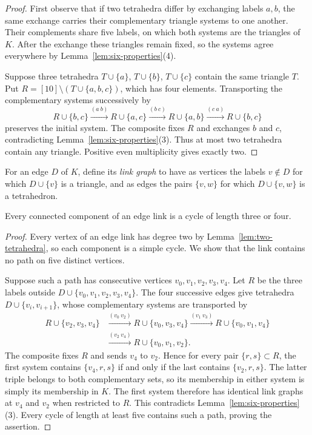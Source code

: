 \begin{proof}
First observe that if two tetrahedra differ by exchanging labels $a,b$,
the same exchange carries their complementary triangle systems to one
another. Their complements share five labels, on which both systems are
the triangles of $K$. After the exchange these triangles remain fixed,
so the systems agree everywhere by
Lemma~\ref{lem:six-properties}(4).

Suppose three tetrahedra $T\cup\{a\}$, $T\cup\{b\}$,
$T\cup\{c\}$ contain the same triangle $T$. Put
$R=[10]\setminus(T\cup\{a,b,c\})$, which has four elements. Transporting
the complementary systems successively by
\[
 R\cup\{b,c\}
 \xrightarrow{(a\ b)}R\cup\{a,c\}
 \xrightarrow{(b\ c)}R\cup\{a,b\}
 \xrightarrow{(c\ a)}R\cup\{b,c\}
\]
preserves the initial system. The composite fixes $R$ and exchanges $b$
and $c$, contradicting Lemma~\ref{lem:six-properties}(3). Thus at most
two tetrahedra contain any triangle. Positive even multiplicity gives
exactly two.
\end{proof}

For an edge $D$ of $K$, define its \emph{link graph} to have as vertices
the labels $v\notin D$ for which $D\cup\{v\}$ is a triangle, and as
edges the pairs $\{v,w\}$ for which $D\cup\{v,w\}$ is a tetrahedron.

\begin{lemma}\label{lem:short-links}
Every connected component of an edge link is a cycle of length three
or four.
\end{lemma}

\begin{proof}
Every vertex of an edge link has degree two by
Lemma~\ref{lem:two-tetrahedra}, so each component is a simple cycle.
We show that the link contains no path on five distinct vertices.

Suppose such a path has consecutive vertices $v_0,v_1,v_2,v_3,v_4$.
Let $R$ be the three labels outside $D\cup\{v_0,v_1,v_2,v_3,v_4\}$.
The four successive edges give tetrahedra
$D\cup\{v_i,v_{i+1}\}$, whose complementary systems are transported by
\[
\begin{aligned}
 R\cup\{v_2,v_3,v_4\}
 &\xrightarrow{(v_0\ v_2)} R\cup\{v_0,v_3,v_4\}
 \xrightarrow{(v_1\ v_3)} R\cup\{v_0,v_1,v_4\}\\
 &\xrightarrow{(v_2\ v_4)} R\cup\{v_0,v_1,v_2\}.
\end{aligned}
\]
The composite fixes $R$ and sends $v_4$ to $v_2$. Hence for every pair
$\{r,s\}\subset R$, the first system contains $\{v_4,r,s\}$ if and
only if the last contains $\{v_2,r,s\}$. The latter triple belongs to
both complementary sets, so its membership in either system is simply
its membership in $K$. The first system therefore has identical link
graphs at $v_4$ and $v_2$ when restricted to $R$. This contradicts
Lemma~\ref{lem:six-properties}(3). Every cycle of length at least five
contains such a path, proving the assertion.
\end{proof}

